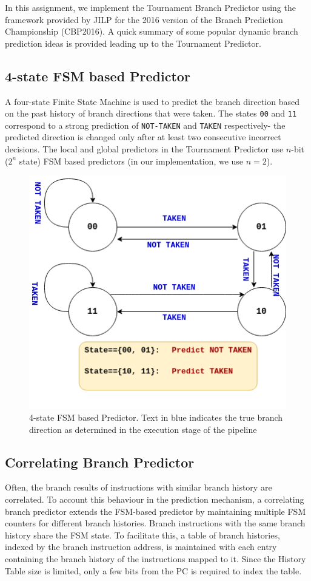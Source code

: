\documentclass[12pt,a4paper,english]{paper}
\begin{document}
In this assignment, we implement the Tournament Branch Predictor \cite{mcfarling_combining_1993} using the framework provided by JILP for the 2016 version of the Branch Prediction Championship (CBP2016). A quick summary of some popular dynamic branch prediction ideas is provided leading up to the Tournament Predictor. 

\subsection{4-state FSM based Predictor}
A four-state Finite State Machine is used to predict the branch direction based on the past history of branch directions that were taken. The states \texttt{00} and \texttt{11} correspond to a strong prediction of \texttt{NOT-TAKEN} and \texttt{TAKEN} respectively- the predicted direction is changed only after at least two consecutive incorrect decisions. The local and global predictors in the Tournament Predictor use $n$-bit ($2^n$ state) FSM based predictors (in our implementation, we use $n=2$).
\begin{figure}[H]
    \centering
    \includegraphics[scale=0.5]{4stateFSM.png}
    \caption{4-state FSM based Predictor. Text in blue indicates the true branch direction as determined in the execution stage of the pipeline}
\end{figure}

\subsection{Correlating Branch Predictor}
Often, the branch results of instructions with similar branch history are correlated. To account this behaviour in the prediction mechanism, a correlating branch predictor extends the FSM-based predictor by maintaining multiple FSM counters for different branch histories. Branch instructions with the same branch history share the FSM state. To facilitate this, a table of branch histories, indexed by the branch instruction address, is maintained with each entry containing the branch history of the instructions mapped to it. Since the History Table size is limited, only a few bits from the PC is required to index the table.
\end{document}
